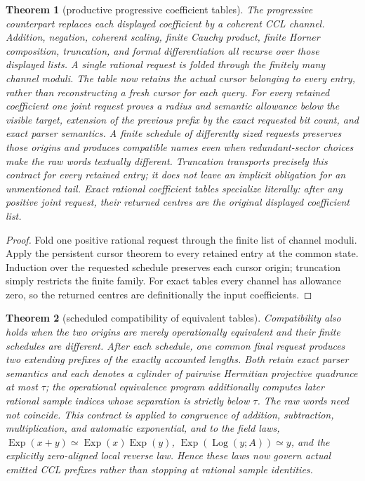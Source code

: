 \documentclass[10pt]{article}
\newtheorem{theorem}{Theorem}[section]
\theoremstyle{definition}
\theoremstyle{remark}
\begin{document}
\begin{theorem}[productive progressive coefficient tables]
The progressive counterpart replaces each displayed coefficient by a
coherent CCL channel.  Addition, negation, coherent scaling, finite Cauchy
product, finite Horner composition, truncation, and formal differentiation
all recurse over those displayed lists.  A single rational request is folded
through the finitely many channel moduli.  The table now retains the actual
cursor belonging to every entry, rather than reconstructing a fresh cursor
for each query.  For every retained coefficient one joint request proves a
radius and semantic allowance below the visible target, extension of the
previous prefix by the exact requested bit count, and exact parser semantics.
A finite schedule of differently sized requests preserves those origins and
produces compatible names even when redundant-sector choices make the raw
words textually different.  Truncation transports precisely this contract for
every retained entry; it does not leave an implicit obligation for an
unmentioned tail.  Exact rational coefficient tables specialize literally:
after any positive joint request, their returned centres are the original
displayed coefficient list.
\end{theorem}

\begin{proof}
Fold one positive rational request through the finite list of channel moduli.
Apply the persistent cursor theorem to every retained entry at the common
state.  Induction over the requested schedule preserves each cursor origin;
truncation simply restricts the finite family.  For exact tables every
channel has allowance zero, so the returned centres are definitionally the
input coefficients.
\end{proof}

\begin{theorem}[scheduled compatibility of equivalent tables]
Compatibility also holds when the two origins are merely operationally
equivalent and their finite schedules are different.  After each schedule,
one common final request produces two extending prefixes of the exactly
accounted lengths.  Both retain exact parser semantics and each denotes a
cylinder of pairwise Hermitian projective quadrance at most $\tau$; the operational
equivalence program additionally computes later rational sample indices whose
separation is strictly below $\tau$.  The raw words need not coincide.  This
contract is applied to congruence of addition, subtraction, multiplication,
and automatic exponential, and to the field laws,
$\operatorname{Exp}(x+y)\simeq
  \operatorname{Exp}(x)\operatorname{Exp}(y)$,
$\operatorname{Exp}(\operatorname{Log}(y;A))\simeq y$, and the explicitly
zero-aligned local reverse law.  Hence these laws now govern actual emitted
CCL prefixes rather than stopping at rational sample identities.
\end{theorem}
\end{document}
